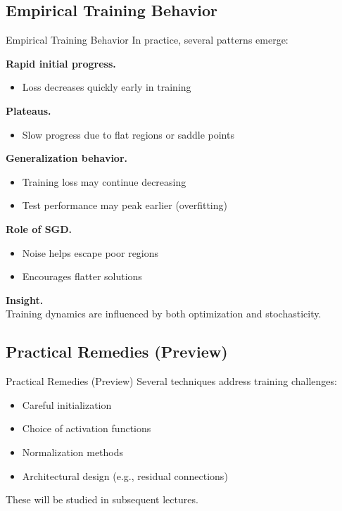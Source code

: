 \documentclass[aspectratio=169,11pt]{beamer}
\begin{document}
\subsection{Empirical Training Behavior}
\begin{frame}[t,allowframebreaks]{Empirical Training Behavior}
\small
In practice, several patterns emerge:

\textbf{Rapid initial progress.}\\ \begin{itemize}
    \item Loss decreases quickly early in training
\end{itemize}

\textbf{Plateaus.}\\ \begin{itemize}
    \item Slow progress due to flat regions or saddle points
\end{itemize}

\textbf{Generalization behavior.}\\ \begin{itemize}
    \item Training loss may continue decreasing
    \item Test performance may peak earlier (overfitting)
\end{itemize}

\textbf{Role of SGD.}\\ \begin{itemize}
    \item Noise helps escape poor regions
    \item Encourages flatter solutions
\end{itemize}

\textbf{Insight.}\\ Training dynamics are influenced by both optimization and stochasticity.
\end{frame}

\subsection{Practical Remedies (Preview)}
\begin{frame}[t,allowframebreaks]{Practical Remedies (Preview)}
\small
Several techniques address training challenges:

\begin{itemize}
    \item Careful initialization
    \item Choice of activation functions
    \item Normalization methods
    \item Architectural design (e.g., residual connections)
\end{itemize}

These will be studied in subsequent lectures.
\end{frame}
\end{document}

